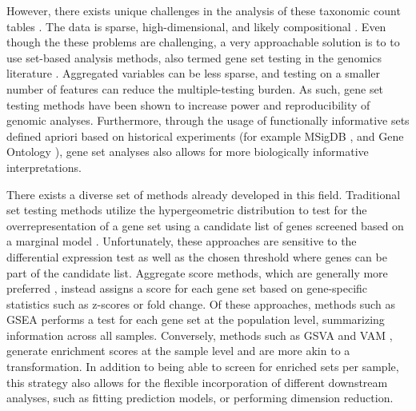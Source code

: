 \documentclass[10pt,letterpaper]{article}
\begin{document}
However, there exists unique challenges in the analysis of these taxonomic count tables \cite{li2019a,li2015}. The data is sparse, high-dimensional, and likely compositional \cite{gloor2017, li2019a, li2015}. Even though the these problems are challenging, a very approachable solution is to to use set-based analysis methods, also termed gene set testing in the genomics literature \cite{khatri2012, goeman2007}. Aggregated variables can be less sparse, and testing on a smaller number of features can reduce the multiple-testing burden. As such, gene set testing methods have been shown to increase power and reproducibility of genomic analyses. Furthermore, through the usage of functionally informative sets defined apriori based on historical experiments (for example MSigDB \cite{subramanian2005}, and Gene Ontology \cite{ashburner2000}), gene set analyses also allows for more biologically informative interpretations. 

There exists a diverse set of methods already developed in this field. Traditional set testing methods utilize the hypergeometric distribution to test for the overrepresentation of a gene set using a candidate list of genes screened based on a marginal model \cite{goeman2007}. Unfortunately, these approaches are sensitive to the differential expression test as well as the chosen threshold where genes can be part of the candidate list. Aggregate score methods, which are generally more preferred \cite{irizarry2009}, instead assigns a score for each gene set based on gene-specific statistics such as z-scores or fold change. Of these approaches, methods such as GSEA \cite{subramanian2005} performs a test for each gene set at the population level, summarizing information across all samples. Conversely, methods such as GSVA \cite{hanzelmann2013} and VAM \cite{frost2020}, generate enrichment scores at the sample level and are more akin to a transformation. In addition to being able to screen for enriched sets per sample, this strategy also allows for the flexible incorporation of different downstream analyses, such as fitting prediction models, or performing dimension reduction.  

\end{document}

